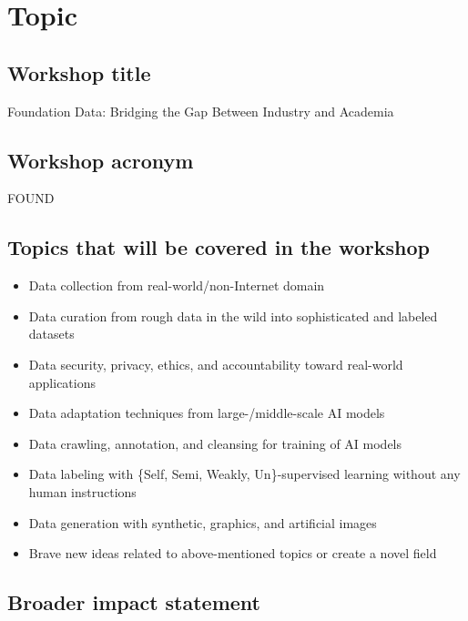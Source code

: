\documentclass{article}
\begin{document}
\section{Topic}

\subsection{Workshop title}
Foundation Data: Bridging the Gap Between Industry and Academia



\subsection{Workshop acronym}
FOUND

\subsection{Topics that will be covered in the workshop}
\begin{itemize}
    \item Data collection from real-world/non-Internet domain
    \item Data curation from rough data in the wild into sophisticated and labeled datasets
    \item Data security, privacy, ethics, and accountability toward real-world applications
    \item Data adaptation techniques from large-/middle-scale AI models
    \item Data crawling, annotation, and cleansing for training of AI models
    \item Data labeling with \{Self, Semi, Weakly, Un\}-supervised learning without any human instructions
    \item Data generation with synthetic, graphics, and artificial images
    \item Brave new ideas related to above-mentioned topics or create a novel field
\end{itemize}

\subsection{Broader impact statement}
\end{document}
